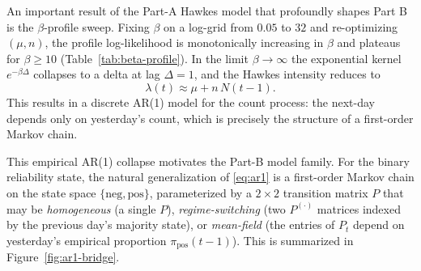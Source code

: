 \documentclass[11pt]{article}
\newcommand{\pipos}{\pi_{\mathrm{pos}}}
\begin{document}
An important result of the Part-A Hawkes model that profoundly shapes Part B is the
$\beta$-profile sweep. Fixing $\beta$ on
a log-grid from $0.05$ to $32$ and re-optimizing $(\mu,n)$, the profile
log-likelihood is monotonically increasing in $\beta$ and plateaus for
$\beta\geq 10$ (Table~\ref{tab:beta-profile}). In the limit
$\beta\to\infty$ the exponential kernel $e^{-\beta\Delta}$ collapses to a
delta at lag $\Delta=1$, and the Hawkes intensity reduces to
\begin{equation}
  \lambda(t)\approx \mu + n\,N(t-1).
  \label{eq:ar1}
\end{equation}
This results in a discrete AR(1) model for the count
process: the next-day depends only on yesterday's count, which is
precisely the structure of a first-order Markov chain.

This empirical AR(1) collapse motivates the Part-B model family.
For the binary reliability state, the natural generalization of
\eqref{eq:ar1} is a first-order Markov chain on the state space
$\{\mathrm{neg},\mathrm{pos}\}$, parameterized by a $2{\times}2$ transition
matrix $P$ that may be \emph{homogeneous} (a single $P$), \emph{regime-switching}
(two $P^{(\cdot)}$ matrices indexed by the previous day's majority state), or
\emph{mean-field} (the entries of $P_t$ depend on yesterday's
empirical proportion $\pipos(t-1)$). This is summarized in
Figure~\ref{fig:ar1-bridge}.
\end{document}
